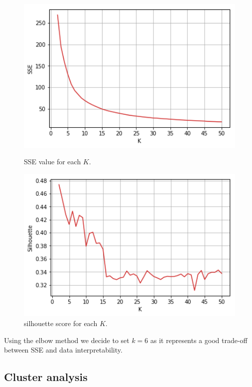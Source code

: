\begin{figure}[h]
  \begin{minipage}[h]{.50\textwidth}
    \includegraphics[width=1\textwidth]{img/ch3/kmeans_sse}
     \caption{SSE value for each $K$.}
  \end{minipage}
    \begin{minipage}[h]{.50\textwidth}
    \includegraphics[width=1\textwidth]{img/ch3/kmeans_silhouette}
     \caption{silhouette score for each $K$.}
  \end{minipage}
\end{figure}

Using the elbow method we decide to set $k=6$ as it represents a good trade-off between SSE and data interpretability.

\subsection{Cluster analysis}

